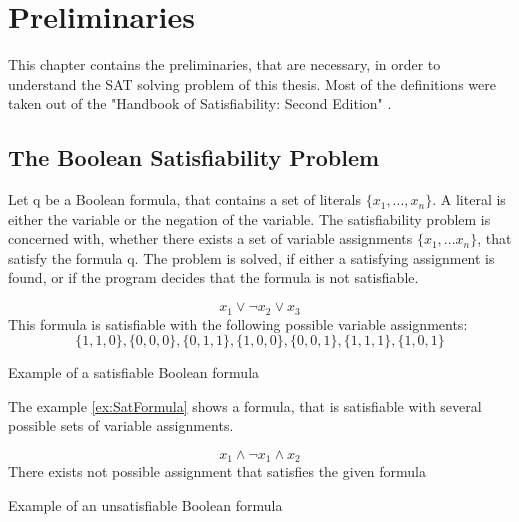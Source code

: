 
\chapter{Preliminaries}
\label{ch:Preliminaries}

This chapter contains the preliminaries, that are necessary, in order to understand the SAT solving problem of this thesis. Most of the definitions were taken out of the "Handbook of Satisfiability: Second Edition" \cite{biere2009handbook}.

\section{The Boolean Satisfiability Problem}
Let q be a Boolean formula, that contains a set of literals $\{x_1,...,x_n\}$. A literal is either the variable or the negation of the variable. The satisfiability problem is concerned with, whether there exists a set of variable assignments $\{x_1,...x_n\}$, that satisfy the formula q. The problem is solved, if either a satisfying assignment is found, or if the program decides that the formula is not satisfiable. \cite{biere2009handbook}

\begin{example}
\begin{leftbar}
\begin{displaymath}
x_1 \vee \neg x_2 \vee x_3
\end{displaymath}
This formula is satisfiable with the following possible variable assignments:
\begin{displaymath}
\{1,1,0\},\{0,0,0\},\{0,1,1\},\{1,0,0\},\{0,0,1\},\{1,1,1\},\{1,0,1\}
\end{displaymath}
\end{leftbar}
\caption{Example of a satisfiable Boolean formula}
\label{ex:SatFormula}
\end{example}

The example \ref{ex:SatFormula} shows a formula, that is satisfiable with several possible sets of variable assignments.

\begin{example}
\begin{leftbar}
\begin{displaymath}
x_1 \wedge \neg x_1 \wedge x_2
\end{displaymath}
There exists not possible assignment that satisfies the given formula
\end{leftbar}
\caption{Example of an unsatisfiable Boolean formula}
\label{ex:UnsatFormula}
\end{example}

